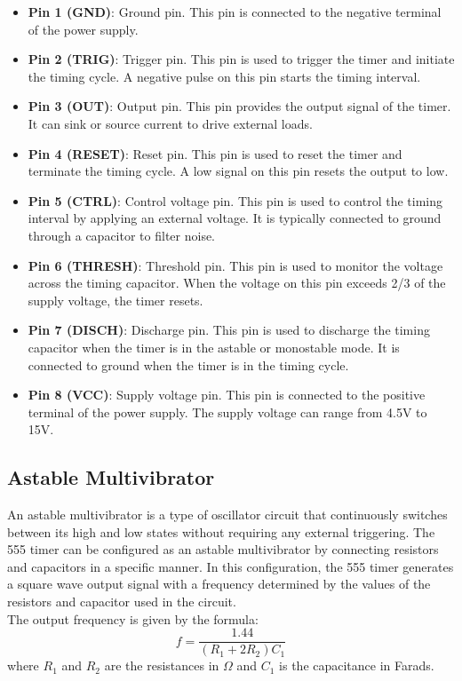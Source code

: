 \documentclass[12pt]{article}
\begin{document}
\begin{itemize}
    \item \textbf{Pin 1 (GND)}: Ground pin. This pin is connected to the negative terminal of the power supply.
    \item \textbf{Pin 2 (TRIG)}: Trigger pin. This pin is used to trigger the timer and initiate the timing cycle. A negative pulse on this pin starts the timing interval.
    \item \textbf{Pin 3 (OUT)}: Output pin. This pin provides the output signal of the timer. It can sink or source current to drive external loads.
    \item \textbf{Pin 4 (RESET)}: Reset pin. This pin is used to reset the timer and terminate the timing cycle. A low signal on this pin resets the output to low.
    \item \textbf{Pin 5 (CTRL)}: Control voltage pin. This pin is used to control the timing interval by applying an external voltage. It is typically connected to ground through a capacitor to filter noise.
    \item \textbf{Pin 6 (THRESH)}: Threshold pin. This pin is used to monitor the voltage across the timing capacitor. When the voltage on this pin exceeds 2/3 of the supply voltage, the timer resets.
    \item \textbf{Pin 7 (DISCH)}: Discharge pin. This pin is used to discharge the timing capacitor when the timer is in the astable or monostable mode. It is connected to ground when the timer is in the timing cycle.   
    \item \textbf{Pin 8 (VCC)}: Supply voltage pin. This pin is connected to the positive terminal of the power supply. The supply voltage can range from 4.5V to 15V.
\end{itemize} 

\subsection{Astable Multivibrator}
An astable multivibrator is a type of oscillator circuit that continuously switches between its high and low states without requiring any external triggering. The 555 timer can be configured as an astable multivibrator by connecting resistors and capacitors in a specific manner. In this configuration, the 555 timer generates a square wave output signal with a frequency determined by the values of the resistors and capacitor used in the circuit.\\
The output frequency is given by the formula:
\begin{equation}
    f = \frac{1.44}{(R_1 + 2R_2)C_1}
\end{equation}
where $R_1$ and $R_2$ are the resistances in $\Omega$ and $C_1$ is the capacitance in Farads.\\
\end{document}
